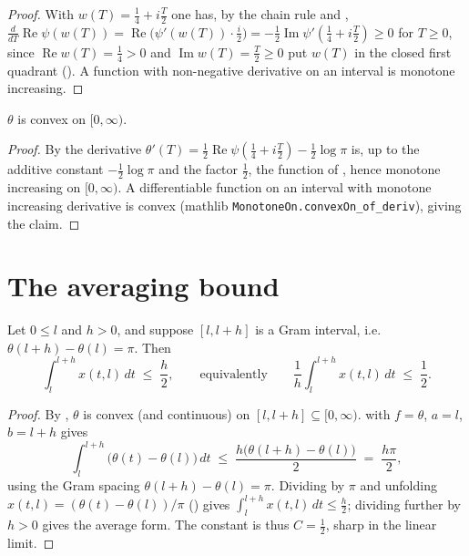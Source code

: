 \begin{proof}
\leanok
{}
With $w(T)=\tfrac14+i\tfrac T2$ one has, by the chain rule and ,
$\tfrac{d}{dT}\operatorname{Re}\psi(w(T))=\operatorname{Re}\bigl(\psi'(w(T))\cdot\tfrac i2\bigr)
=-\tfrac12\operatorname{Im}\psi'\!\left(\tfrac14+i\tfrac T2\right)\ge0$ for $T\ge0$, since
$\operatorname{Re}w(T)=\tfrac14>0$ and $\operatorname{Im}w(T)=\tfrac T2\ge0$ put $w(T)$ in
the closed first quadrant (). A function with
non-negative derivative on an interval is monotone increasing.
\end{proof}

\begin{lemma}
\label{lem:ga_theta_convex}
\leanok
{}
$\theta$ is convex on $[0,\infty)$.
\end{lemma}

\begin{proof}
\leanok
{}
By  the derivative
$\theta'(T)=\tfrac12\operatorname{Re}\psi(\tfrac14+i\tfrac T2)-\tfrac12\log\pi$ is,
up to the additive constant $-\tfrac12\log\pi$ and the factor $\tfrac12$, the
function of , hence monotone increasing on $[0,\infty)$.
A differentiable function on an interval with monotone increasing derivative is
convex (mathlib \texttt{MonotoneOn.convexOn\_of\_deriv}), giving the claim.
\end{proof}

\section{The averaging bound}
\label{sec:ga_main}

\begin{theorem}
\label{thm:ga_main}
\leanok
{}
Let $0\le l$ and $h>0$, and suppose $[l,l+h]$ is a Gram interval, i.e.
$\theta(l+h)-\theta(l)=\pi$. Then
\[
  \int_l^{l+h} x(t,l)\,dt\;\le\;\frac h2,
  \qquad\text{equivalently}\qquad
  \frac1h\int_l^{l+h} x(t,l)\,dt\;\le\;\frac12 .
\]
\end{theorem}

\begin{proof}
\leanok
{}
By , $\theta$ is convex (and continuous) on $[l,l+h]\subseteq[0,\infty)$.
 with $f=\theta$, $a=l$, $b=l+h$ gives
\[
  \int_l^{l+h}\bigl(\theta(t)-\theta(l)\bigr)\,dt
  \;\le\;\frac{h\bigl(\theta(l+h)-\theta(l)\bigr)}{2}
  \;=\;\frac{h\pi}{2},
\]
using the Gram spacing $\theta(l+h)-\theta(l)=\pi$. Dividing by $\pi$ and unfolding
$x(t,l)=(\theta(t)-\theta(l))/\pi$ () gives
$\int_l^{l+h} x(t,l)\,dt\le\tfrac h2$; dividing further by $h>0$ gives the average
form. The constant is thus $C=\tfrac12$, sharp in the linear limit.
\end{proof}

